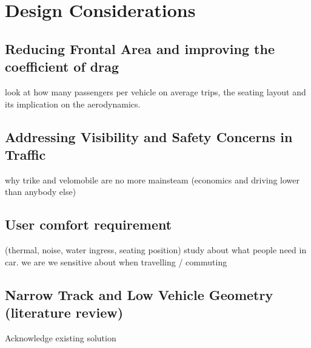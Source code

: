 \section{Design Considerations}

\subsection{Reducing Frontal Area and improving the coefficient of drag}
look at how many passengers per vehicle on average trips, the seating layout and its implication on the aerodynamics.

\subsection{Addressing Visibility and Safety Concerns in Traffic}

why trike and velomobile are no more mainsteam (economics and  driving lower than anybody else)

\subsection{User comfort requirement}
(thermal, noise, water ingress, seating position)
study about what people need in car. we are we sensitive about when travelling / commuting
\subsection{Narrow Track and Low Vehicle Geometry (literature review)}
Acknowledge existing solution